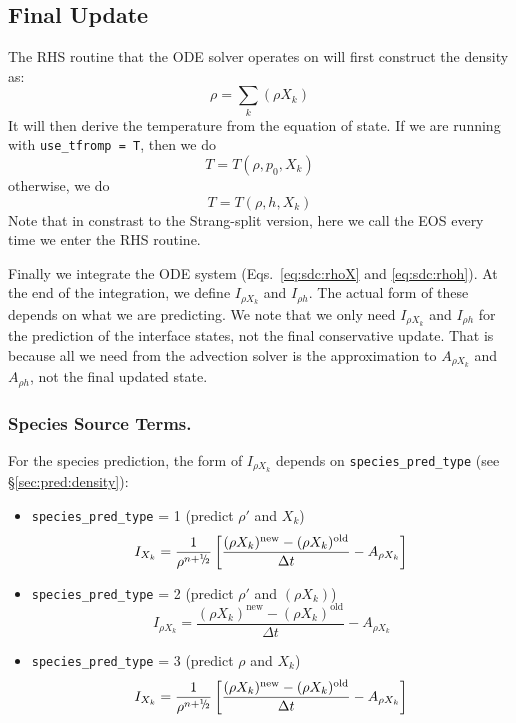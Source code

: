 \subsection{Final Update}

The RHS routine that the ODE solver operates on will first construct
the density as:
\begin{equation}
\rho = \sum_k (\rho X_k)
\end{equation}
It will then derive the temperature from the equation of state.  If we
are running with {\tt use\_tfromp = T}, then we do
\begin{equation}
T = T(\rho, p_0, X_k)
\end{equation}
otherwise, we do
\begin{equation}
T = T(\rho, h, X_k)
\end{equation}
Note that in constrast to the Strang-split version, here we call the EOS
every time we enter the RHS routine.

Finally we integrate the ODE system (Eqs.~\ref{eq:sdc:rhoX} and \ref{eq:sdc:rhoh}).
At the end of the integration, we define $I_{\rho X_k}$ and $I_{\rho
  h}$.  The actual form of these depends on what we are predicting.
We note that we only need $I_{\rho X_k}$ and $I_{\rho h}$ for the
prediction of the interface states, not the final conservative update.
That is because all we need from the advection solver is the
approximation to $A_{\rho X_k}$ and $A_{\rho h}$, not the final
updated state.

\subsubsection{Species Source Terms.}
For the species prediction, the form of $I_{\rho X_k}$ depends on
{\tt species\_pred\_type} (see \S \ref{sec:pred:density}):  
\begin{itemize}
\item {\tt species\_pred\_type} = 1 (predict $\rho'$ and $X_k$)
%
\begin{equation}
I_{X_k} = \frac{1}{\rho^{n+\myhalf}} \left [ 
      \frac{(\rho X_k)^\mathrm{new} - 
            (\rho X_k)^\mathrm{old}}{\Delta t} - A_{\rho X_k}  \right ]
\end{equation}

\item {\tt species\_pred\_type} = 2 (predict $\rho'$ and $(\rho X_k)$)
%
\begin{equation}
I_{\rho X_k} = \frac{(\rho X_k)^\mathrm{new} - (\rho X_k)^\mathrm{old}}{\Delta t} - A_{\rho X_k} 
\label{eq:sdc:Irhoo}
\end{equation}

\item {\tt species\_pred\_type} = 3 (predict $\rho$ and $X_k$)
%
\begin{equation}
I_{X_k} = \frac{1}{\rho^{n+\myhalf}} \left [ 
      \frac{(\rho X_k)^\mathrm{new} - 
            (\rho X_k)^\mathrm{old}}{\Delta t} - A_{\rho X_k}  \right ]
\end{equation}

\end{itemize}

